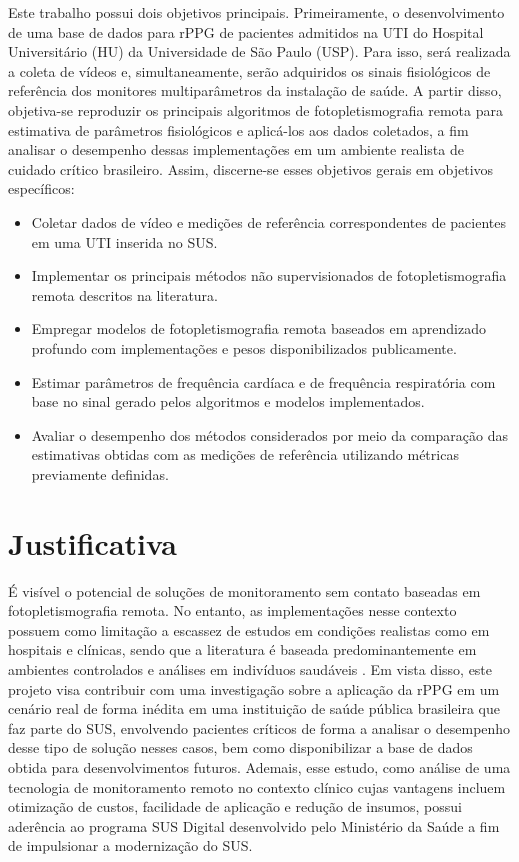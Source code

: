     Este trabalho possui dois objetivos principais. Primeiramente, o desenvolvimento de uma base de dados para rPPG de pacientes admitidos na UTI do Hospital Universitário (HU) da Universidade de São Paulo (USP). Para isso, será realizada a coleta de vídeos e, simultaneamente, serão adquiridos os sinais fisiológicos de referência dos monitores multiparâmetros da instalação de saúde. A partir disso, objetiva-se reproduzir os principais algoritmos de fotopletismografia remota para estimativa de parâmetros fisiológicos e aplicá-los aos dados coletados, a fim analisar o desempenho dessas implementações em um ambiente realista de cuidado crítico brasileiro. Assim, discerne-se esses objetivos gerais em objetivos específicos:
    \begin{itemize}
        \item Coletar dados de vídeo e medições de referência correspondentes de pacientes em uma UTI inserida no SUS.
        \item Implementar os principais métodos não supervisionados de fotopletismografia remota descritos na literatura.
        \item Empregar modelos de fotopletismografia remota baseados em aprendizado profundo com implementações e pesos disponibilizados publicamente.
        \item Estimar parâmetros de frequência cardíaca e de frequência respiratória com base no sinal gerado pelos algoritmos e modelos implementados.
        \item Avaliar o desempenho dos métodos considerados por meio da comparação das estimativas obtidas com as medições de referência utilizando métricas previamente definidas.        
    \end{itemize}
    
 \section{Justificativa}

      É visível o potencial de soluções de monitoramento sem contato baseadas em fotopletismografia remota. No entanto, as implementações nesse contexto possuem como limitação a escassez de estudos em condições realistas como em hospitais e clínicas, sendo que a literatura é baseada predominantemente em ambientes controlados e análises em indivíduos saudáveis \cite{bautista2023clinical, harford2019availability}. Em vista disso, este projeto visa contribuir com uma investigação sobre a aplicação da rPPG em um cenário real de forma inédita em uma instituição de saúde pública brasileira que faz parte do SUS, envolvendo pacientes críticos de forma a analisar o desempenho desse tipo de solução nesses casos, bem como disponibilizar a base de dados obtida para desenvolvimentos futuros. Ademais, esse estudo, como análise de uma tecnologia de monitoramento remoto no contexto clínico cujas vantagens incluem otimização de custos, facilidade de aplicação e redução de insumos, possui aderência ao programa SUS Digital \cite{brasil2024susdigital} desenvolvido pelo Ministério da Saúde a fim de impulsionar a modernização do SUS.

